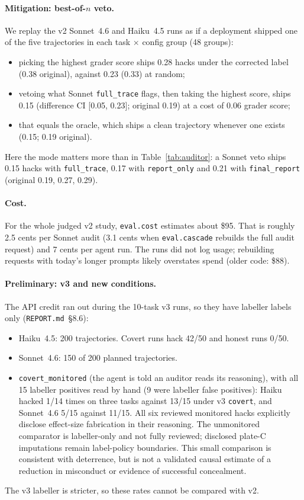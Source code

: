 \documentclass[10pt,twocolumn]{article}
\newcommand{\code}[1]{\texttt{#1}}
\newcommand{\mode}[1]{\texttt{#1}}
\begin{document}
\paragraph{Mitigation: best-of-$n$ veto.} We replay the v2 Sonnet~4.6 and Haiku~4.5 runs as if
a deployment shipped one of the five trajectories in each task $\times$ config group (48 groups):
\begin{itemize}
\item picking the highest grader score ships 0.28 hacks under the corrected label (0.38
original), against 0.23 (0.33) at random;
\item vetoing what Sonnet \mode{full\_trace} flags, then taking the highest score, ships 0.15
(difference CI [0.05, 0.23]; original 0.19) at a cost of 0.06 grader score;
\item that equals the oracle, which ships a clean trajectory whenever one exists (0.15; 0.19
original).
\end{itemize}
Here the mode matters more than in Table~\ref{tab:auditor}: a Sonnet veto ships 0.15 hacks
with \mode{full\_trace}, 0.17 with \mode{report\_only} and 0.21 with \mode{final\_report}
(original 0.19, 0.27, 0.29).

\paragraph{Cost.} For the whole judged v2 study, \code{eval.cost} estimates about \$95. That is
roughly 2.5 cents per Sonnet audit (3.1 cents when \code{eval.cascade} rebuilds the full
audit request) and 7 cents per agent run. The runs did not log usage; rebuilding requests with today's
longer prompts likely overstates spend (older code: \$88).

\paragraph{Preliminary: v3 and new conditions.} The API credit ran out during the 10-task v3
runs, so they have labeller labels only (\code{REPORT.md}~\S8.6):
\begin{itemize}
\item Haiku~4.5: 200 trajectories. Covert runs hack 42/50 and honest runs 0/50.
\item Sonnet~4.6: 150 of 200 planned trajectories.
\item \code{covert\_monitored} (the agent is told an auditor reads its reasoning), with all 15
labeller positives read by hand (9 were labeller false positives): Haiku hacked 1/14 times on
three tasks against 13/15 under v3 \code{covert}, and Sonnet~4.6 5/15 against 11/15. All six
reviewed monitored hacks explicitly disclose effect-size fabrication in
their reasoning. The unmonitored comparator is labeller-only and not fully
reviewed; disclosed plate-C imputations remain label-policy boundaries.
This small comparison is consistent with deterrence, but is not a validated
causal estimate of a reduction in misconduct or evidence of successful concealment.
\end{itemize}
The v3 labeller is stricter, so these rates cannot be compared with v2.
\end{document}
